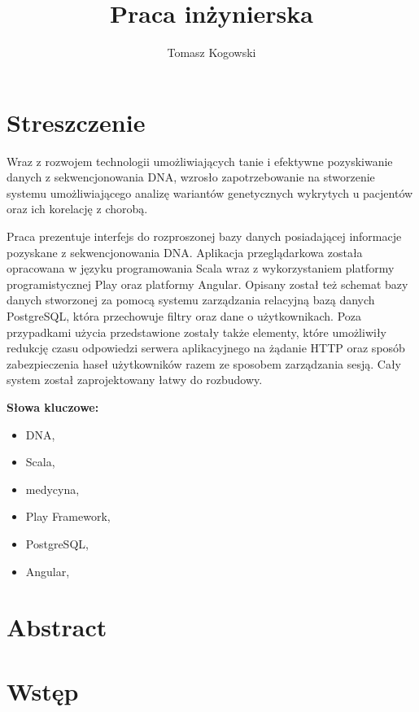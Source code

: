 \documentclass[a4paper,12pt,twoside]{article}
\title{Praca inżynierska}
\author{Tomasz Kogowski}
\begin{document}

\newpage 
\section*{Streszczenie}


Wraz z rozwojem technologii umożliwiających tanie i efektywne
pozyskiwanie danych z sekwencjonowania DNA, wzrosło zapotrzebowanie
na stworzenie systemu umożliwiającego analizę wariantów genetycznych wykrytych u pacjentów oraz ich korelację z chorobą.

Praca prezentuje interfejs do rozproszonej bazy danych posiadającej
informacje pozyskane z sekwencjonowania DNA. Aplikacja przeglądarkowa została opracowana
w języku programowania Scala wraz z wykorzystaniem platformy programistycznej
Play oraz platformy Angular. Opisany został też schemat bazy danych
stworzonej za pomocą systemu zarządzania relacyjną bazą danych PostgreSQL, która
przechowuje filtry oraz dane o użytkownikach.
Poza przypadkami użycia przedstawione zostały także
elementy, które umożliwiły redukcję czasu odpowiedzi serwera
aplikacyjnego na żądanie HTTP oraz sposób zabezpieczenia
haseł użytkowników razem ze sposobem zarządzania sesją.
Cały system został zaprojektowany łatwy do rozbudowy.

\textbf{Słowa kluczowe:}
\begin{itemize}
\item DNA,
\item Scala,
\item medycyna,
\item Play Framework,
\item PostgreSQL,
\item Angular,
\end{itemize}
\newpage 
\section*{Abstract}

\newpage

\newpage
\tableofcontents
 
\newpage
\section{Wstęp}  
\end{document}
